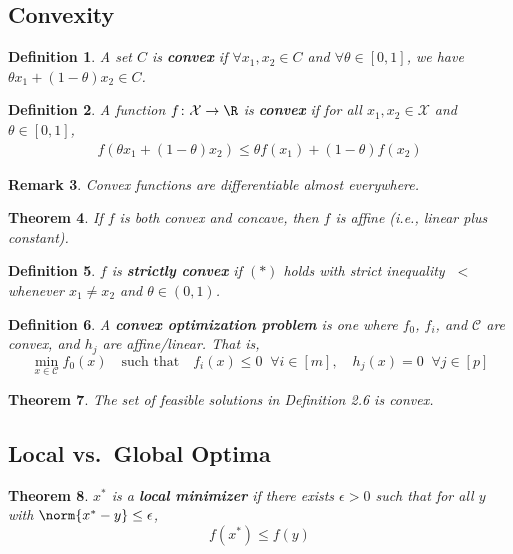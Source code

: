 \documentclass[a4paper]{article}
\newtheorem{thm}{Theorem}[section]
\newtheorem{defn}[thm]{Definition}
\newtheorem{rmk}[thm]{Remark}
\begin{document}
\subsection{Convexity}
\begin{defn}
    A set $C$ is \textbf{convex} if $\forall x_1, x_2 \in C$ and $\forall \theta \in [0, 1]$, we have $\theta x_1 + (1-\theta)x_2 \in C$.
\end{defn}

\begin{defn}
    A function $f\colon \mathcal{X} \to \R$ is \textbf{convex} if for all $x_1, x_2 \in \mathcal{X}$ and $\theta \in [0, 1]$,
    \begin{align*}
        f(\theta x_1 + (1-\theta)x_2) \leq \theta f(x_1) + (1-\theta)f(x_2) \tag{*}
    \end{align*}
\end{defn}

\begin{rmk}
    Convex functions are differentiable almost everywhere.
\end{rmk}

\begin{thm}
    If $f$ is both convex and concave, then $f$ is affine (i.e., linear plus constant).
\end{thm}

\begin{defn}
    $f$ is \textbf{strictly convex} if $(*)$ holds with strict inequality $\;<$ whenever $x_1 \neq x_2$ and $\theta \in (0, 1)$.
\end{defn}

\begin{defn}
    A \textbf{convex optimization problem} is one where $f_0$, $f_i$, and $\mathcal{C}$ are convex, and $h_j$ are affine/linear. That is,
    \[
        \min_{x \in \mathcal{C}} f_0(x)
        \quad\text{such that}\quad
        f_i(x) \leq 0\;\; \forall i \in [m], \quad h_j(x) = 0\;\; \forall j \in [p]
    \]
\end{defn}

\begin{thm}
    The set of feasible solutions in Definition 2.6 is convex.
\end{thm}

\subsection{Local vs.\ Global Optima}
\begin{thm}
    $x^*$ is a \textbf{local minimizer} if there exists $\epsilon > 0$ such that for all $y$ with $\norm{x^* - y} \leq \epsilon$,
    \[
        f(x^*) \leq f(y)
    \]
\end{thm}
\end{document}
